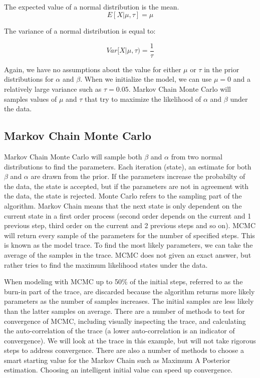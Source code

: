 \documentclass[12pt]{article}
\begin{document}
    \begin{center}
    \end{center}
    { \hspace*{\fill} \\}
    
    The expected value of a normal distribution is the mean.
\[ E[ X | \mu, \tau] = \mu\]

The variance of a normal distribution is equal to:

\[ Var[ X | \mu, \tau) = \frac{1}{\tau}\]

Again, we have no assumptions about the value for either \(\mu\) or
\(\tau\) in the prior distributions for \(\alpha\) and \(\beta\). When
we initialize the model, we can use \(\mu = 0\) and a relatively large
variance such as \(\tau = 0.05\). Markov Chain Monte Carlo will samples
values of \(\mu\) and \(\tau\) that try to maximize the likelihood of
\(\alpha\) and \(\beta\) under the data.

    \hypertarget{markov-chain-monte-carlo}{%
\subsection{Markov Chain Monte Carlo}\label{markov-chain-monte-carlo}}

    Markov Chain Monte Carlo will sample both \(\beta\) and \(\alpha\) from
two normal distributions to find the parameters. Each iteration (state),
an estimate for both \(\beta\) and \(\alpha\) are drawn from the prior.
If the parameters increase the probabilty of the data, the state is
accepted, but if the parameters are not in agreement with the data, the
state is rejected. Monte Carlo refers to the sampling part of the
algorithm. Markov Chain means that the next state is only dependent on
the current state in a first order process (second order depends on the
current and 1 previous step, third order on the current and 2 previous
steps and so on). MCMC will return every sample of the parameters for
the number of specified steps. This is known as the model trace. To find
the most likely parameters, we can take the average of the samples in
the trace. MCMC does not given an exact answer, but rather tries to find
the maximum likelihood states under the data.

When modeling with MCMC up to 50\% of the initial steps, referred to as
the burn-in part of the trace, are discarded because the algorithm
returns more likely parameters as the number of samples increases. The
initial samples are less likely than the latter samples on average.
There are a number of methods to test for convergence of MCMC, including
visually inspecting the trace, and calculating the auto-correlation of
the trace (a lower auto-correlation is an indicator of convergence). We
will look at the trace in this example, but will not take rigorous steps
to address convergence. There are also a number of methods to choose a
smart starting value for the Markov Chain such as Maximum A Posterior
estimation. Choosing an intelligent initial value can speed up
convergence.
\end{document}
